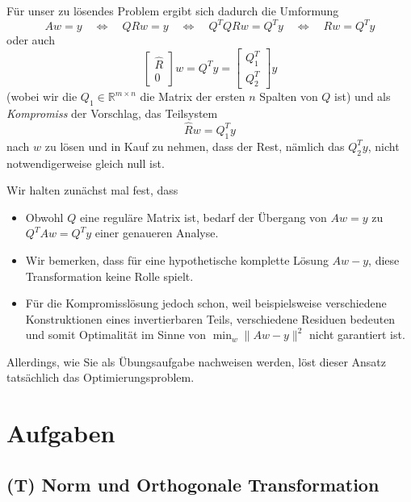 \documentclass[]{book}
\providecommand{\tightlist}{%
  \setlength{\itemsep}{0pt}\setlength{\parskip}{0pt}}
\theoremstyle{definition}
\theoremstyle{definition}
\theoremstyle{definition}
\theoremstyle{definition}
\theoremstyle{remark}
\begin{document}
Für unser zu lösendes Problem ergibt sich dadurch die Umformung
\begin{equation*}
Aw = y \quad \Leftrightarrow \quad QRw=y \quad \Leftrightarrow \quad Q^TQRw=Q^T y 
 \quad \Leftrightarrow \quad  Rw = Q^Ty
\end{equation*}
oder auch
\begin{equation*}
\begin{bmatrix}
\hat R \\ 0
\end{bmatrix}w 
=
Q^Ty
=
\begin{bmatrix}
Q_1^T \\ Q_2^T
\end{bmatrix}
y
\end{equation*}
(wobei wir die \(Q_1\in \mathbb R^{m\times n}\) die Matrix der ersten \(n\) Spalten von \(Q\) ist)
und als \emph{Kompromiss} der Vorschlag, das Teilsystem
\begin{equation*}
\hat R w = Q_1^Ty
\end{equation*}
nach \(w\) zu lösen und in Kauf zu nehmen, dass der Rest, nämlich das \(Q_2^Ty\), nicht notwendigerweise gleich null ist.

Wir halten zunächst mal fest, dass

\begin{itemize}
\tightlist
\item
  Obwohl \(Q\) eine reguläre Matrix ist, bedarf der Übergang von \(Aw=y\) zu \(Q^TAw=Q^Ty\) einer genaueren Analyse.
\item
  Wir bemerken, dass für eine hypothetische komplette Lösung \(Aw-y\), diese Transformation keine Rolle spielt.
\item
  Für die Kompromisslösung jedoch schon, weil beispielsweise verschiedene Konstruktionen eines invertierbaren Teils, verschiedene Residuen bedeuten und somit Optimalität im Sinne von \(\min_w \|Aw-y\|^2\) nicht garantiert ist.
\end{itemize}

Allerdings, wie Sie als Übungsaufgabe nachweisen werden, löst dieser Ansatz tatsächlich das Optimierungsproblem.

\hypertarget{aufgaben-1}{%
\section{Aufgaben}\label{aufgaben-1}}

\hypertarget{t-norm-und-orthogonale-transformation}{%
\subsection{(T) Norm und Orthogonale Transformation}\label{t-norm-und-orthogonale-transformation}}
\end{document}

